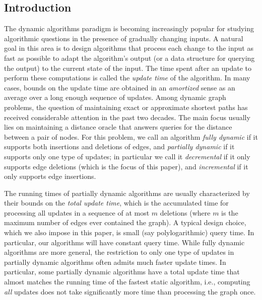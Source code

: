 \documentclass[11pt]{article}
\theoremstyle{definition}
\theoremstyle{remark}
\begin{document}
\begin{titlepage}
\section{Introduction}
The dynamic algorithms paradigm is becoming increasingly popular for studying algorithmic questions in the presence of gradually changing inputs.
A natural goal in this area is to design algorithms that process each change to the input as fast as possible to adapt the algorithm's output (or a data structure for querying the output) to the current state of the input.
The time spent after an update to perform these computations is called the \emph{update time} of the algorithm.
In many cases, bounds on the update time are obtained in an \emph{amortized} sense as an average over a long enough sequence of updates. Among dynamic graph problems, the question of maintaining exact or approximate shortest paths has received considerable attention in the past two decades. The main focus usually lies on maintaining a distance oracle that answers queries for the distance between a pair of nodes.
For this problem, we call an algorithm \emph{fully dynamic} if it supports both insertions and deletions of edges, and \emph{partially dynamic} if it supports only one type of updates; in particular we call it \emph{decremental} if it only supports edge deletions  (which is the focus of this paper), and \emph{incremental} if it only supports edge insertions. 

The running times of partially dynamic algorithms are usually characterized by their bounds on the \emph{total update time}, which is the accumulated time for processing all updates in a sequence of at most $ m $ deletions (where $ m $ is the maximum number of edges ever contained the graph).
A typical design choice, which we also impose in this paper, is small (say polylogarithmic) query time. In particular, our algorithms will have constant query time.
While fully dynamic algorithms are more general, the restriction to only one type of updates in partially dynamic algorithms often admits much faster update times.
In particular, some partially dynamic algorithms have a total update time that almost matches the running time of the fastest static algorithm, i.e., computing \emph{all} updates does not take significantly more time than processing the graph once.


\end{titlepage}
\end{document}
